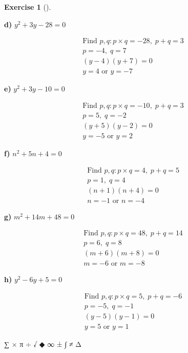 \documentclass[
  letterpaper,
  DIV=11,
  numbers=noendperiod]{scrreprt}
\theoremstyle{definition}
\newtheorem{exercise}{Exercise}[chapter]
\theoremstyle{remark}
\begin{document}
\begin{exercise}[]
\begin{tcolorbox}
\textbf{d)} \(\displaystyle y^2 + 3y - 28 = 0\)

\begin{align*}
\text{Find } p, q: p \times q = -28,\; p + q = 3 \\ p = -4,\; q = 7 \\ (y - 4)(y + 7) = 0 \\ y = 4 \text{ or } y = -7
\end{align*}

\textbf{e)} \(\displaystyle y^2 + 3y - 10 = 0\)

\begin{align*}
\text{Find } p, q: p \times q = -10,\; p + q = 3 \\ p = 5,\; q = -2 \\ (y + 5)(y - 2) = 0 \\ y = -5 \text{ or } y = 2
\end{align*}

\textbf{f)} \(\displaystyle n^2 + 5n + 4 = 0\)

\begin{align*}
\text{Find } p, q: p \times q = 4,\; p + q = 5 \\ p = 1,\; q = 4 \\ (n + 1)(n + 4) = 0 \\ n = -1 \text{ or } n = -4
\end{align*}

\textbf{g)} \(\displaystyle m^2 + 14m + 48 = 0\)

\begin{align*}
\text{Find } p, q: p \times q = 48,\; p + q = 14 \\ p = 6,\; q = 8 \\ (m + 6)(m + 8) = 0 \\ m = -6 \text{ or } m = -8
\end{align*}

\textbf{h)} \(\displaystyle y^2 - 6y + 5 = 0\)

\begin{align*}
\text{Find } p, q: p \times q = 5,\; p + q = -6 \\ p = -5,\; q = -1 \\ (y - 5)(y - 1) = 0 \\ y = 5 \text{ or } y = 1
\end{align*}

\end{tcolorbox}

\end{exercise}

∑ × π ÷ √ ◆ ∞ ± ∫ ≠ Δ
\end{document}

